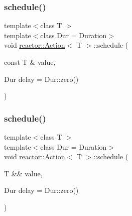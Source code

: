 \mbox{\label{classreactor_1_1Action_a1dc2c0762950c330da3345f9192d62fa}} 
\subsubsection{\texorpdfstring{schedule()}{schedule()}\hspace{0.1cm}{\footnotesize\ttfamily [3/4]}}
{\footnotesize\ttfamily template$<$class T $>$ \\
template$<$class Dur  = Duration$>$ \\
void \hyperlink{classreactor_1_1Action}{reactor\+::\+Action}$<$ T $>$\+::schedule (\begin{DoxyParamCaption}\item[{const T \&}]{value,  }\item[{Dur}]{delay = {\ttfamily Dur\+:\+:zero()} }\end{DoxyParamCaption})\hspace{0.3cm}{\ttfamily [inline]}}

\mbox{\label{classreactor_1_1Action_ad8afb46b0b3bb753538cd37f7eae3be1}} 
\subsubsection{\texorpdfstring{schedule()}{schedule()}\hspace{0.1cm}{\footnotesize\ttfamily [4/4]}}
{\footnotesize\ttfamily template$<$class T $>$ \\
template$<$class Dur  = Duration$>$ \\
void \hyperlink{classreactor_1_1Action}{reactor\+::\+Action}$<$ T $>$\+::schedule (\begin{DoxyParamCaption}\item[{T \&\&}]{value,  }\item[{Dur}]{delay = {\ttfamily Dur\+:\+:zero()} }\end{DoxyParamCaption})\hspace{0.3cm}{\ttfamily [inline]}}

\mbox{\label{classreactor_1_1Action_a5e6698cc0893efca3a088f2158345b9c}} 
